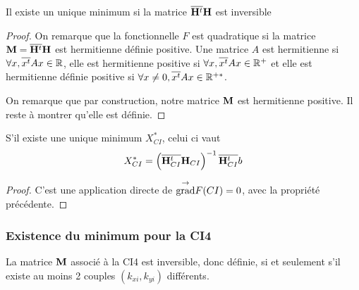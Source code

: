     \begin{prop}
      Il existe un unique minimum si la matrice \({\overline{\mathbf{H}^t}}{\mathbf{H}}\) est inversible
    \end{prop}

    \begin{proof}
      On remarque que la fonctionnelle \(F\) est quadratique si la matrice \(\mathbf{M}={\overline{\mathbf{H}^t}}{\mathbf{H}}\) est hermitienne définie positive. Une matrice \(A\) est hermitienne si \(\forall x, {\overline{x^t}}Ax \in \mathbb R\), elle est hermitienne positive si \(\forall x, {\overline{x^t}}Ax \in \mathbb R^+\) et elle est hermitienne définie positive si \(\forall x\not=0, {\overline{x^t}}Ax \in \mathbb R^{+*}\).

      On remarque que par construction, notre matrice \(\mathbf{M}\) est hermitienne positive. Il reste à montrer qu'elle est définie.
    \end{proof}

    \begin{prop}
      S'il existe une unique minimum \(X_{CI}^*\), celui ci vaut
      \[
        X_{CI}^* = \left({\overline{\mathbf{H}_{CI}^t}}{\mathbf{H}_{CI}}\right)^{-1}{\overline{\mathbf{H}_{CI}^t}}b
      \]
    \end{prop}

    \begin{proof}
      C'est une application directe de \({{\overset{\rightarrow}{\operatorname{grad}}}}{} F(CI) = 0 \), avec la propriété précédente.
    \end{proof}

    \subsubsection{Existence du minimum pour la CI4}

      \begin{prop}
        La matrice \({\mathbf{M}}\) associé à la CI4 est inversible, donc définie, si et seulement s'il existe au moins 2 couples \((k_{xi},k_{yi})\) différents.
      \end{prop}

